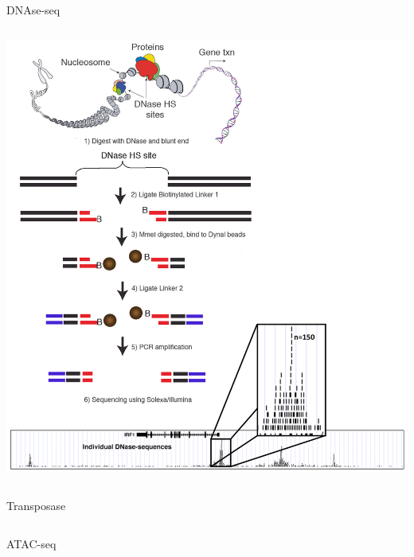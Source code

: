 \documentclass{beamer}
\begin{document}
\begin{frame}{DNAse-seq}
\begin{columns}
\includegraphics[width=\linewidth]{song_2010_dnase-seq.png}
\end{columns}
\end{frame}


\begin{frame}{Transposase}
\begin{columns}
\end{columns}
\end{frame}

\begin{frame}{ATAC-seq}
\begin{columns}
\end{columns}
\end{frame}
\end{document}
